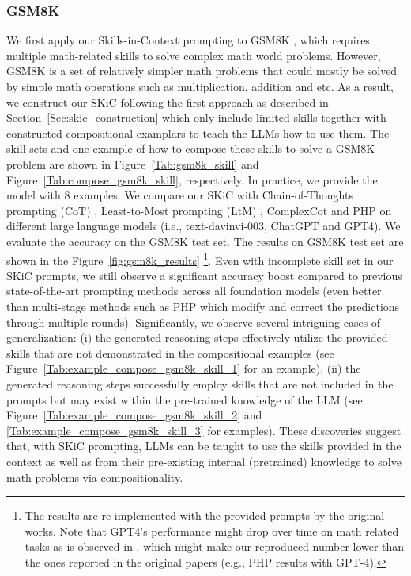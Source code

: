 \subsubsection{GSM8K}
We first apply our Skills-in-Context prompting to GSM8K \citep{cobbe2021training}, which requires multiple math-related skills to solve complex math world problems. However, GSM8K is a set of relatively simpler math problems that could mostly be solved by simple math operations such as multiplication, addition and etc. As a result, we construct our SKiC following the first approach as described in Section~\ref{Sec:skic_construction}
which only include limited skills together with constructed compositional examplars to teach the LLMs how to use them. The skill sets and one example of how to compose these skills to solve a GSM8K problem are shown in Figure~\ref{Tab:gsm8k_skill} and Figure~\ref{Tab:compose_gsm8k_skill}, respectively. In practice, we provide the model with 8 examples.  We compare our SKiC with Chain-of-Thoughts prompting (CoT) \citep{wei2022chain}, Least-to-Most prompting (LtM) \citep{zhou2022least}, ComplexCot \citep{fu2022complexity} and PHP \citep{zheng2023progressive} on different large language models (i.e., text-davinvi-003, ChatGPT and GPT4). We evaluate the accuracy on the GSM8K test set. The results on GSM8K test set are shown in the Figure~\ref{fig:gsm8k_results} \footnote{The results are re-implemented with the provided prompts by the original works. Note that GPT4's performance might drop over time on math related tasks as is observed in \citet{chen2023chatgpts}, which might make our reproduced number lower than the ones reported in the original papers (e.g., PHP results with GPT-4).}. Even with incomplete skill set in our SKiC prompts, we still observe a significant accuracy boost compared to previous state-of-the-art prompting methods across all foundation models (even better than multi-stage methods such as PHP which modify and correct the predictions through multiple rounds). Significantly, we observe several intriguing cases of generalization: (i) the generated reasoning steps effectively utilize the provided skills that are not demonstrated in the compositional examples (see Figure~\ref{Tab:example_compose_gsm8k_skill_1} for an example), (ii) the generated reasoning steps successfully employ skills that are not included in the prompts but may exist within the pre-trained knowledge of the LLM (see Figure~\ref{Tab:example_compose_gsm8k_skill_2} and \ref{Tab:example_compose_gsm8k_skill_3} for examples). These discoveries suggest that, with SKiC prompting, LLMs can be taught to use the skills provided in the context as well as from their pre-existing internal (pretrained) knowledge to solve math problems via compositionality. 



